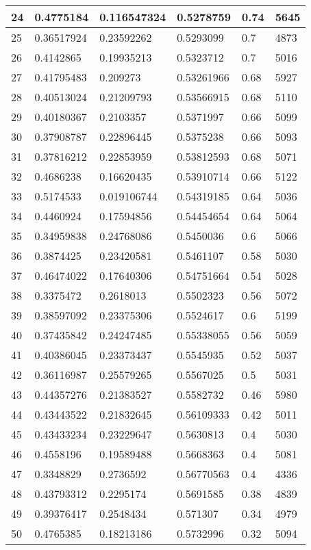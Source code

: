 \begin{longtable}{|l|l|l|l|l|l|}
24 & 0.4775184 & 0.116547324 & 0.5278759 & 0.74 & 5645 \\ \hline 
25 & 0.36517924 & 0.23592262 & 0.5293099 & 0.7 & 4873 \\ \hline 
26 & 0.4142865 & 0.19935213 & 0.5323712 & 0.7 & 5016 \\ \hline 
27 & 0.41795483 & 0.209273 & 0.53261966 & 0.68 & 5927 \\ \hline 
28 & 0.40513024 & 0.21209793 & 0.53566915 & 0.68 & 5110 \\ \hline 
29 & 0.40180367 & 0.2103357 & 0.5371997 & 0.66 & 5099 \\ \hline 
30 & 0.37908787 & 0.22896445 & 0.5375238 & 0.66 & 5093 \\ \hline 
31 & 0.37816212 & 0.22853959 & 0.53812593 & 0.68 & 5071 \\ \hline 
32 & 0.4686238 & 0.16620435 & 0.53910714 & 0.66 & 5122 \\ \hline 
33 & 0.5174533 & 0.019106744 & 0.54319185 & 0.64 & 5036 \\ \hline 
34 & 0.4460924 & 0.17594856 & 0.54454654 & 0.64 & 5064 \\ \hline 
35 & 0.34959838 & 0.24768086 & 0.5450036 & 0.6 & 5066 \\ \hline 
36 & 0.3874425 & 0.23420581 & 0.5461107 & 0.58 & 5030 \\ \hline 
37 & 0.46474022 & 0.17640306 & 0.54751664 & 0.54 & 5028 \\ \hline 
38 & 0.3375472 & 0.2618013 & 0.5502323 & 0.56 & 5072 \\ \hline 
39 & 0.38597092 & 0.23375306 & 0.5524617 & 0.6 & 5199 \\ \hline 
40 & 0.37435842 & 0.24247485 & 0.55338055 & 0.56 & 5059 \\ \hline 
41 & 0.40386045 & 0.23373437 & 0.5545935 & 0.52 & 5037 \\ \hline 
42 & 0.36116987 & 0.25579265 & 0.5567025 & 0.5 & 5031 \\ \hline 
43 & 0.44357276 & 0.21383527 & 0.5582732 & 0.46 & 5980 \\ \hline 
44 & 0.43443522 & 0.21832645 & 0.56109333 & 0.42 & 5011 \\ \hline 
45 & 0.43433234 & 0.23229647 & 0.5630813 & 0.4 & 5030 \\ \hline 
46 & 0.4558196 & 0.19589488 & 0.5668363 & 0.4 & 5081 \\ \hline 
47 & 0.3348829 & 0.2736592 & 0.56770563 & 0.4 & 4336 \\ \hline 
48 & 0.43793312 & 0.2295174 & 0.5691585 & 0.38 & 4839 \\ \hline 
49 & 0.39376417 & 0.2548434 & 0.571307 & 0.34 & 4979 \\ \hline 
50 & 0.4765385 & 0.18213186 & 0.5732996 & 0.32 & 5094 \\ \hline 
\end{longtable}